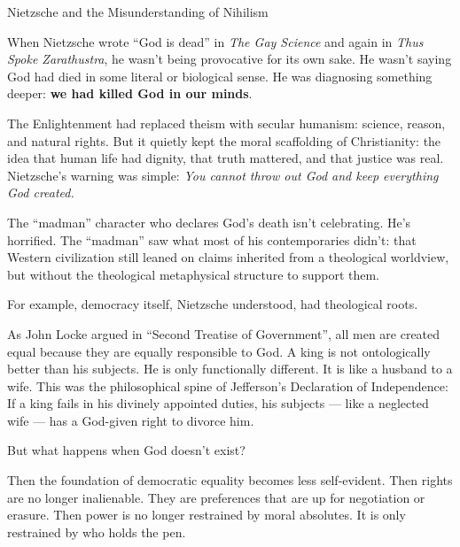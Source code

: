 \begin{HistoricalSidebar}{Nietzsche and the Misunderstanding of Nihilism}

  When Nietzsche wrote “God is dead” in \textit{The Gay Science} and again in \textit{Thus Spoke Zarathustra}, 
  he wasn’t being provocative for its own sake.  
  He wasn’t saying God had died in some literal or biological sense.  
  He was diagnosing something deeper: \textbf{we had killed God in our minds}.

  \medskip
  
  The Enlightenment had replaced theism with secular humanism: science, reason, and natural rights.  
  But it quietly kept the moral scaffolding of Christianity: the idea that human life had dignity, that truth mattered, 
  and that justice was real.  
  Nietzsche’s warning was simple: \textit{You cannot throw out God and keep everything God created.}

  \medskip
  
  The ``madman'' character who declares God's death isn’t celebrating. He’s horrified.  
  The ``madman'' saw what most of his contemporaries didn’t: that Western civilization still leaned on 
  claims inherited from a theological worldview, but without the theological metaphysical structure to support them.
  
  \medskip
  
  For example, democracy itself, Nietzsche understood, had theological roots.

  \medskip
  
  As John Locke argued in ``Second Treatise of Government'', all men are created equal because they are equally 
  responsible to God.  
  A king is not ontologically better than his subjects. He is only functionally different. It is like a husband 
  to a wife.  
  This was the philosophical spine of Jefferson’s Declaration of Independence:  
  If a king fails in his divinely appointed duties, his subjects — like a neglected wife — has a God-given right 
  to divorce him.

  \medskip
  
  But what happens when God doesn’t exist?

  \medskip
  
  Then the foundation of democratic equality becomes less self-evident.  
  Then rights are no longer inalienable. They are preferences that are up for negotiation or erasure.  
  Then power is no longer restrained by moral absolutes. It is only restrained by who holds the pen.
  

\end{HistoricalSidebar}

